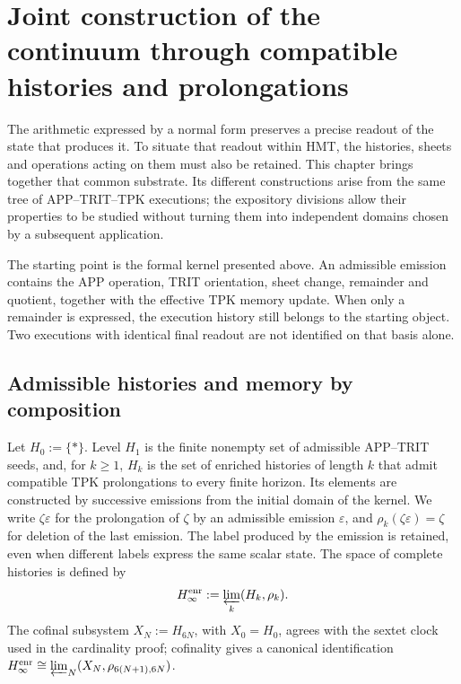 \section{Joint construction of the continuum through compatible histories and prolongations}
\label{hmtfg:base:iv:continuo-conjunto}
The arithmetic expressed by a normal form preserves a precise readout of the state that produces it. To situate that readout within HMT, the histories, sheets and operations acting on them must also be retained. This chapter brings together that common substrate. Its different constructions arise from the same tree of APP–TRIT–TPK executions; the expository divisions allow their properties to be studied without turning them into independent domains chosen by a subsequent application.

The starting point is the formal kernel presented above. An admissible emission contains the APP operation, TRIT orientation, sheet change, remainder and quotient, together with the effective TPK memory update. When only a remainder is expressed, the execution history still belongs to the starting object. Two executions with identical final readout are not identified on that basis alone.



\subsection{Admissible histories and memory by composition}
Let \(H_0:=\{\ast\}\). Level \(H_1\) is the finite nonempty set of admissible APP--TRIT seeds, and, for \(k\geq1\), \(H_k\) is the set of enriched histories of length \(k\) that admit compatible TPK prolongations to every finite horizon. Its elements are constructed by successive emissions from the initial domain of the kernel. We write \(\zeta\varepsilon\) for the prolongation of \(\zeta\) by an admissible emission \(\varepsilon\), and \(\rho_k(\zeta\varepsilon)=\zeta\) for deletion of the last emission. The label produced by the emission is retained, even when different labels express the same scalar state. The space of complete histories is defined by
\[
 H_\infty^{\rm enr}:=\varprojlim_k(H_k,\rho_k).
\]
The cofinal subsystem \(X_N:=H_{6N}\), with \(X_0=H_0\), agrees with the sextet clock used in the cardinality proof; cofinality gives a canonical identification \(H_\infty^{\rm enr}\cong\varprojlim_N(X_N,\rho_{6(N+1),6N})\).

